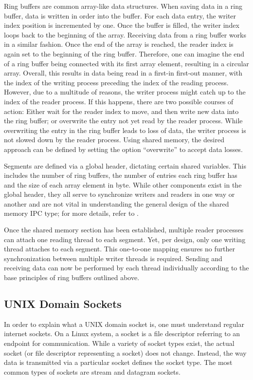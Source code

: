 Ring buffers are common array-like data structures.
When saving data in a ring buffer, data is written in order into the buffer.
For each data entry, the writer index position is incremented by one.
Once the buffer is filled, the writer index loops back to the beginning of the array.
Receiving data from a ring buffer works in a similar fashion.
Once the end of the array is reached, the reader index is again set to the beginning of the ring buffer.
Therefore, one can imagine the end of a ring buffer being connected with its first array element, resulting in a circular array.
Overall, this results in data being read in a first-in first-out manner, with the index of the writing process preceding the index of the reading process.
However, due to a multitude of reasons, the writer process might catch up to the index of the reader process.
If this happens, there are two possible courses of action:
Either wait for the reader index to move, and then write new data into the ring buffer; or overwrite the entry not yet read by the reader process.
While overwriting the entry in the ring buffer leads to loss of data, the writer process is not slowed down by the reader process.
Using shared memory, the desired approach can be defined by setting the option ``overwrite'' to accept data losses\cite{raatschen:ipc}.

Segments are defined via a global header, dictating certain shared variables.
This includes the number of ring buffers, the number of entries each ring buffer has and the size of each array element in byte.
While other components exist in the global header, they all serve to synchronize writers and readers in one way or another and are not vital in understanding the general design of the shared memory \ac{IPC} type; for more details, refer to \cite{raatschen:ipc}.

Once the shared memory section has been established, multiple reader processes can attach one reading thread to each segment.
Yet, per design, only one writing thread attaches to each segment.
This one-to-one mapping ensures no further synchronization between multiple writer threads is required.
Sending and receiving data can now be performed by each thread individually according to the base principles of ring buffers outlined above.

\subsection{UNIX Domain Sockets}
\label{cha:UNIXDomainSockets}
In order to explain what a UNIX domain socket is, one must understand regular internet sockets.
On a Linux system, a socket is a file descriptor referring to an endpoint for communication\cite{man:sockets}.
While a variety of socket types exist, the actual socket (or file descriptor representing a socket) does not change.
Instead, the way data is transmitted via a particular socket defines the socket type.
The most common types of sockets are stream and datagram sockets.

